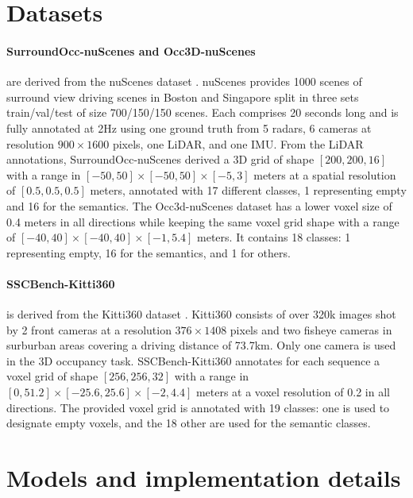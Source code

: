 \clearpage
\setcounter{page}{1}
\maketitlesupplementary

\appendix

\section{Datasets}
\label{app:datasets}


\paragraph{SurroundOcc-nuScenes \citep{wei2023surroundocc} and Occ3D-nuScenes \citep{tian2023occ3d}} are derived from the nuScenes dataset \cite{caesar2020nuscenes}. nuScenes provides 1000 scenes of surround view driving scenes in Boston and Singapore split in three sets train/val/test of size 700/150/150 scenes. Each comprises 20 seconds long and is fully annotated at 2Hz using one ground truth from 5 radars, 6 cameras at resolution $900 \times 1600$ pixels, one LiDAR, and one IMU.
From the LiDAR annotations, SurroundOcc-nuScenes \cite{wei2023surroundocc} derived a 3D grid of shape $[200,200,16]$ with a range in $[-50,50] \times [-50,50] \times [-5,3]$ meters at a spatial resolution of $[0.5,0.5,0.5]$ meters, annotated with 17 different classes, 1 representing empty and 16 for the semantics. 
The Occ3d-nuScenes \cite{tian2023occ3d} dataset has a lower voxel size of 0.4 meters in all directions while keeping the same voxel grid shape with a range of $[-40,40]\times [-40,40]\times [-1,5.4]$ meters. It contains 18 classes: 1 representing empty, 16 for the semantics, and 1 for others.
\paragraph{SSCBench-Kitti360 \cite{li2024sscbench}} is derived from the Kitti360 dataset \cite{Liao2022PAMI}. Kitti360 consists of over 320k images shot by 2 front cameras at a resolution $376 \times 1408$ pixels and two fisheye cameras in surburban areas covering a driving distance of 73.7km. Only one camera is used in the 3D occupancy task.
SSCBench-Kitti360 \cite{li2024sscbench} annotates for each sequence a voxel grid of shape $[256,256,32]$ with a range in $[0,51.2] \times [-25.6,25.6] \times [-2,4.4]$ meters at a voxel resolution of 0.2 in all directions.
{The provided voxel grid is annotated with 19 classes: one is used to designate empty voxels, and the 18 other are used for the semantic classes.}

\section{Models and implementation details}
\label{app:models}

